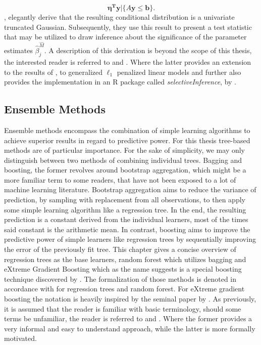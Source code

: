 \documentclass[a4paper,12pt, headsepline]{scrartcl}
\numberwithin{equation}{section}
\begin{document}
\[
\bm{\eta^Ty}|\{A\bm{y} \leq \bm{b}\}.
\]
\citet{Lee2016}, elegantly derive that the resulting conditional distribution is a univariate truncated Gaussian. Subsequently, they use this result to present a test statistic that may be utilized to draw inference about the significance of the parameter estimates $\hat\beta_j^{\hat M}$. A description of this derivation is beyond the scope of this thesis, the interested reader is referred to \citet{Lee2016} and \citet{tib2016}. Where the latter provides an extension to the results of \citet{Lee2016}, to generalized $\ell_1$ penalized linear models and further also provides the implementation in an R package called \textit{selectiveInference}, by \citet{selectiveInference}.

\subsection{Ensemble Methods}\label{subsec:ens}
Ensemble methods encompass the combination of simple learning algorithms to achieve superior results in regard to predictive power. For this thesis tree-based methods are of particular importance. For the sake of simplicity, we may only distinguish between two methods of combining individual trees. Bagging and boosting, the former revolves around bootstrap aggregation, which might be a more familiar term to some readers, that have not been exposed to a lot of machine learning literature. Bootstrap aggregation aims to reduce the variance of prediction, by sampling with replacement from all observations, to then apply some simple learning algorithm like a regression tree. In the end, the resulting prediction is a constant derived from the individual learners, most of the times said constant is the arithmetic mean. In contrast, boosting aims to improve the predictive power of simple learners like regression trees by sequentially improving the error of the previously fit tree. This chapter gives a concise overview of regression trees as the base learners, random forest which utilizes bagging and eXtreme Gradient Boosting which as the name suggests is a special boosting technique discovered by \citet{chen2016}. The formalization of those methods is denoted in accordance with \citet{hastie09} for regression trees and random forest. For eXtreme gradient boosting the notation is heavily inspired by the seminal paper by \citet{chen2016}. As previously, it is assumed that the reader is familiar with basic terminology, should some terms be unfamiliar, the reader is referred to \citet{James2013} and \citet{hastie09}. Where the former provides a very informal and easy to understand approach, while the latter is more formally motivated.
\end{document}
